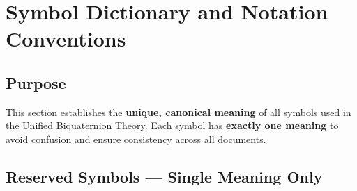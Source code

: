 

\section{Symbol Dictionary and Notation Conventions}
\label{sec:canonical:symbols}

\subsection{Purpose}

This section establishes the \textbf{unique, canonical meaning} of all symbols used in the Unified Biquaternion Theory. Each symbol has \textbf{exactly one meaning} to avoid confusion and ensure consistency across all documents.

\subsection{Reserved Symbols — Single Meaning Only}

